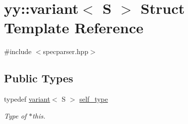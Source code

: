\hypertarget{structyy_1_1variant}{}\section{yy\+:\+:variant$<$ S $>$ Struct Template Reference}
\label{structyy_1_1variant}


{\ttfamily \#include $<$specparser.\+hpp$>$}

\subsection*{Public Types}
\begin{DoxyCompactItemize}
\item 
typedef \hyperlink{structyy_1_1variant}{variant}$<$ S $>$ \hyperlink{structyy_1_1variant_afbd75aee339bd9fa06e6fa8f320cecd3}{self\+\_\+type}\hypertarget{structyy_1_1variant_afbd75aee339bd9fa06e6fa8f320cecd3}{}\label{structyy_1_1variant_afbd75aee339bd9fa06e6fa8f320cecd3}

\begin{DoxyCompactList}\small\item\em Type of $\ast$this. \end{DoxyCompactList}\end{DoxyCompactItemize}
